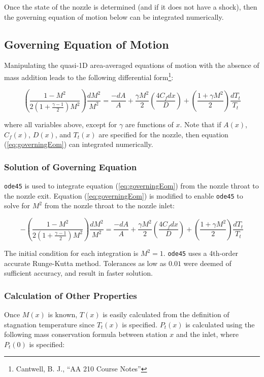 \documentclass{article}
\begin{document}
Once the state of the nozzle is determined (and if it does not have a shock), then the governing equation of motion below can be integrated numerically.

\subsection{Governing Equation of Motion}

Manipulating the quasi-1D area-averaged equations of motion with the absence of mass addition leads to the following differential form\footnote{Cantwell, B. J., ``AA 210 Course Notes''}:

\begin{equation}
\label{eq:governingEom}
\left(\frac{1-M^2}{2(1 + \frac{\gamma-1}{2} )M^2}\right) \frac{dM^2}{M^2} = \frac{-dA}{A} + \frac{\gamma M^2}{2} \left(\frac{4 C_f dx}{D}\right) + \left(\frac{1 + \gamma M^2}{2}\right) \frac{dT_t}{T_t}
\end{equation}

where all variables above, except for $\gamma$ are functions of $x$. Note that if $A(x)$, $C_f(x)$, $D(x)$, and $T_t(x)$ are specified for the nozzle, then equation (\ref{eq:governingEom}) can integrated numerically.

\subsubsection{Solution of Governing Equation}

\texttt{ode45} is used to integrate equation (\ref{eq:governingEom}) from the nozzle throat to the nozzle exit. Equation (\ref{eq:governingEom}) is modified to enable \texttt{ode45} to solve for $M^2$ from the nozzle throat to the nozzle inlet:

\begin{equation}
\label{eq:governingEomModified}
-\left(\frac{1-M^2}{2(1 + \frac{\gamma-1}{2} )M^2}\right) \frac{dM^2}{M^2} = \frac{-dA}{A} + \frac{\gamma M^2}{2} \left(\frac{4 C_f dx}{D}\right) + \left(\frac{1 + \gamma M^2}{2}\right) \frac{dT_t}{T_t}
\end{equation}

The initial condition for each integration is $M^2 = 1$. \texttt{ode45} uses a 4th-order accurate Runge-Kutta method. Tolerances as low as $0.01$ were deemed of sufficient accuracy, and result in faster solution.

\subsubsection{Calculation of Other Properties}
Once $M(x)$ is known, $T(x)$ is easily calculated from the definition of stagnation temperature since $T_t(x)$ is specified. $P_t(x)$ is calculated using the following mass conservation formula between station $x$ and the inlet, where $P_t(0)$ is specified:
\end{document}
